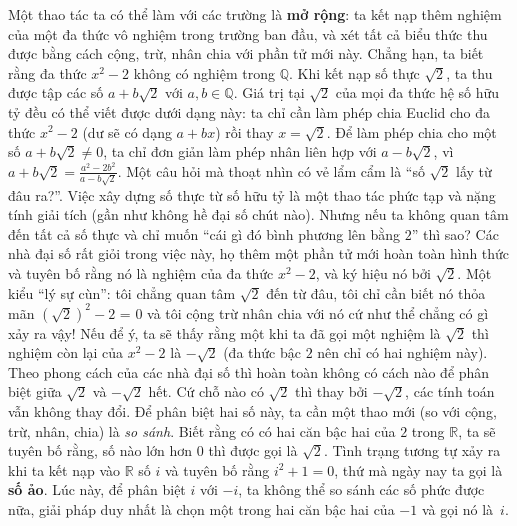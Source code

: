 \begin{multicols}{2}
	\vskip 0.1cm
	Một thao tác ta có thể làm với các trường là {\bf\color{duongvaotoanhoc} mở rộng}: ta kết nạp thêm nghiệm của một đa thức vô nghiệm trong trường ban đầu, và xét tất cả biểu thức thu được bằng cách cộng, trừ, nhân chia với phần tử mới này. Chẳng hạn, ta biết rằng đa thức $x^2 - 2$ không có nghiệm trong $\mathbb{Q}$. Khi kết nạp số thực $\sqrt{2}$, ta thu được tập các số $a + b\sqrt{2}$ với $a,b \in \mathbb{Q}$. Giá trị tại $\sqrt{2}$ của mọi đa thức hệ số hữu tỷ đều có thể viết được dưới dạng này: ta chỉ cần làm phép chia Euclid cho đa thức $x^2 - 2$ (dư sẽ có dạng $a + bx$) rồi thay $x = \sqrt{2}$. Để làm phép chia cho một số $a+b\sqrt{2} \neq 0$, ta chỉ đơn giản làm phép nhân liên hợp với $a-b\sqrt{2}$, vì $a+b\sqrt{2} = \frac{a^2 - 2b^2}{a-b\sqrt{2}}$. 
	\vskip 0.1cm
	Một câu hỏi mà thoạt nhìn có vẻ lẩm cẩm là ``số $\sqrt{2}$ lấy từ đâu ra?''. Việc xây dựng số thực từ số hữu tỷ là một thao tác phức tạp và nặng tính giải tích (gần như không hề đại số chút nào). Nhưng nếu ta không quan tâm đến tất cả số thực và chỉ muốn ``cái gì đó bình phương lên bằng $2$'' thì sao? Các nhà đại số rất giỏi trong việc này, họ thêm một phần tử mới hoàn toàn hình thức và tuyên bố rằng nó là nghiệm của đa thức $x^2 - 2$, và ký hiệu nó bởi $\sqrt{2}$. Một kiểu ``lý sự cùn'': tôi chẳng quan tâm $\sqrt{2}$ đến từ đâu, tôi chỉ cần biết nó thỏa mãn $(\sqrt{2})^2 - 2$ = 0 và tôi cộng trừ nhân chia với nó cứ như thể chẳng có gì xảy ra vậy! Nếu để ý, ta sẽ thấy rằng một khi ta đã gọi một nghiệm là $\sqrt{2}$ thì nghiệm còn lại của $x^2 - 2$ là $-\sqrt{2}$ (đa thức bậc $2$ nên chỉ có hai nghiệm này). Theo phong cách của các nhà đại số thì hoàn toàn không có cách nào để phân biệt giữa $\sqrt{2}$ và $-\sqrt{2}$ hết. Cứ chỗ nào có $\sqrt{2}$ thì thay bởi $-\sqrt{2}$, các tính toán vẫn không thay đổi. Để phân biệt hai số này, ta cần một thao mới (so với cộng, trừ, nhân, chia) là {\it so sánh}. Biết rằng có có hai căn bậc hai của $2$ trong $\mathbb{R}$, ta sẽ tuyên bố rằng, số nào lớn hơn $0$ thì được gọi là $\sqrt{2}$. Tình trạng tương tự xảy ra khi ta kết nạp vào $\mathbb{R}$ số $i$ và tuyên bố rằng $i^2 + 1 = 0$, thứ mà ngày nay ta gọi là {\bf\color{duongvaotoanhoc} số ảo}. Lúc này, để phân biệt $i$ với $-i$, ta không thể so sánh các số phức được nữa, giải pháp duy nhất là chọn một trong hai căn bậc hai của $-1$ và gọi nó là~$i$.
	\vskip 0.1cm

\end{multicols}
